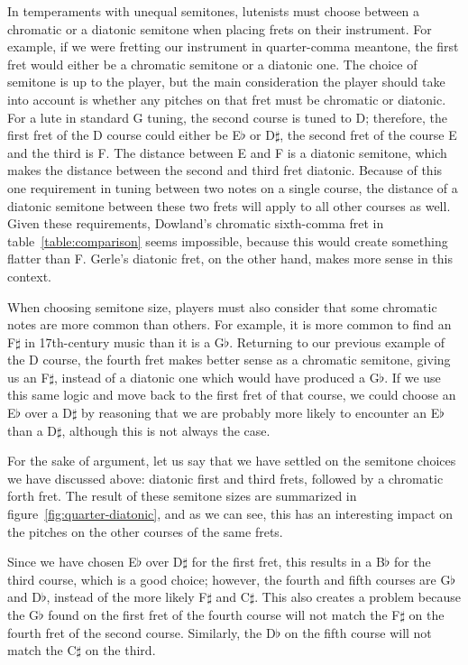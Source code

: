 In temperaments with unequal semitones, lutenists must choose between a chromatic
or a diatonic semitone when placing frets on their instrument.  For example, if we
were fretting our instrument in quarter-comma meantone, the first fret would either be
a chromatic semitone or a diatonic one.  The choice of semitone is up to the player,
but the main consideration the player should take into account is whether any pitches on that
fret must be chromatic or diatonic.  For a lute in standard G tuning, the second
course is tuned to D; therefore, the first fret of the D course could either be
E$\flat$ or D$\sharp$, the second fret of the course E and the third is F.  The
distance between E and F is a diatonic semitone, which makes the distance between the
second and third fret diatonic.  Because of this one requirement in tuning
between two notes on a single course, the distance of a diatonic semitone between these
two frets will apply to all other courses as well.  Given these requirements, Dowland's
chromatic sixth-comma fret in table~\ref{table:comparison} seems impossible, because
this would create something flatter than F. Gerle's diatonic fret, on the other hand,
makes more sense in this context.

When choosing semitone size, players must also consider that some
chromatic notes are more common than others.  For example, it is more common to find an
F$\sharp$ in 17th-century music than it is a G$\flat$.  Returning to our previous example
of the D course, the fourth fret makes better sense as a chromatic semitone, giving us an
F$\sharp$, instead of a diatonic one which would have produced a G$\flat$.  If we use this
same logic and move back to the first fret of that course, we could choose an E$\flat$
over a D$\sharp$ by reasoning that we are probably more likely to encounter an
E$\flat$ than a D$\sharp$, although this is not always the case.

For the sake of argument, let us say that we have settled on the semitone choices we have
discussed above: diatonic first and third frets, followed by a chromatic forth fret.  The
result of these semitone sizes are summarized in figure~\ref{fig:quarter-diatonic}, and as
we can see, this has an interesting impact on the pitches on the other courses
of the same frets.

Since we have chosen E$\flat$ over D$\sharp$ for the first fret, this results in a
B$\flat$ for the third course, which is a good choice; however, the fourth and fifth
courses are G$\flat$ and D$\flat$, instead of the more likely F$\sharp$ and C$\sharp$.
This also creates a problem because the G$\flat$ found on the first fret of the fourth
course will not match the F$\sharp$ on the fourth fret of the second course. Similarly,
the D$\flat$ on the fifth course will not match the C$\sharp$ on the third.

